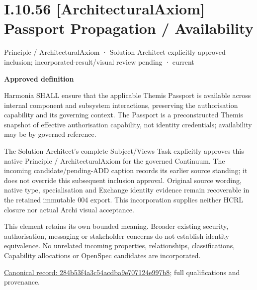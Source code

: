 \section*{I.10.56 [ArchitecturalAxiom] Passport Propagation / Availability}
\label{navigation:I.10.56}

\label{element:284b53f4a3c54acdba9e707124e997b8}
{\small Principle / ArchitecturalAxiom · Solution Architect explicitly approved inclusion; incorporated-result/visual review pending · current}\par

\par\medskip\textbf{Approved definition}\par


Harmonia SHALL ensure that the applicable Themis Passport is available across internal component and subsystem interactions, preserving the authorisation capability and its governing context. The Passport is a preconstructed Themis snapshot of effective authorisation capability, not identity credentials; availability may be by governed reference.



The Solution Architect's complete Subject/Views Task explicitly approves this
native Principle / ArchitecturalAxiom for the governed Continuum.
The incoming candidate/pending-ADD caption records its earlier source standing;
it does not override this subsequent inclusion approval. Original source wording,
native type, specialisation and Exchange identity evidence remain recoverable in
the retained immutable 004 export. This incorporation supplies neither HCRL closure
nor actual Archi visual acceptance.



This element retains its own bounded meaning. Broader existing security,
authorisation, messaging or stakeholder concerns do not establish identity
equivalence. No unrelated incoming properties, relationships, classifications,
Capability allocations or OpenSpec candidates are incorporated.


{\footnotesize \href{../../../../continuum/motivation/principle/architectural-axiom/284b53f4a3c54acdba9e707124e997b8.md}{Canonical record: 284b53f4a3c54acdba9e707124e997b8}; full qualifications and provenance.}\par
